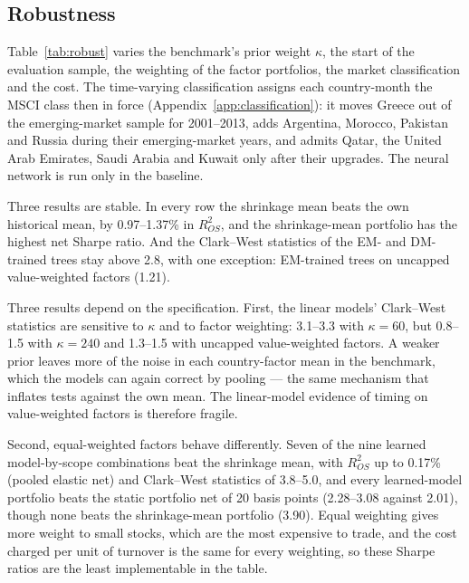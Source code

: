 \documentclass[11pt]{article}
\begin{document}
\subsection{Robustness}
Table~\ref{tab:robust} varies the benchmark's prior weight $\kappa$, the start of the evaluation sample, the weighting of the factor portfolios, the market classification and the cost. The time-varying classification assigns each country-month the MSCI class then in force (Appendix~\ref{app:classification}): it moves Greece out of the emerging-market sample for 2001--2013, adds Argentina, Morocco, Pakistan and Russia during their emerging-market years, and admits Qatar, the United Arab Emirates, Saudi Arabia and Kuwait only after their upgrades. The neural network is run only in the baseline.

Three results are stable. In every row the shrinkage mean beats the own historical mean, by 0.97--1.37\% in $R^2_{OS}$, and the shrinkage-mean portfolio has the highest net Sharpe ratio. And the Clark--West statistics of the EM- and DM-trained trees stay above 2.8, with one exception: EM-trained trees on uncapped value-weighted factors (1.21).

Three results depend on the specification. First, the linear models' Clark--West statistics are sensitive to $\kappa$ and to factor weighting: 3.1--3.3 with $\kappa = 60$, but 0.8--1.5 with $\kappa = 240$ and 1.3--1.5 with uncapped value-weighted factors. A weaker prior leaves more of the noise in each country-factor mean in the benchmark, which the models can again correct by pooling --- the same mechanism that inflates tests against the own mean. The linear-model evidence of timing on value-weighted factors is therefore fragile.

Second, equal-weighted factors behave differently. Seven of the nine learned model-by-scope combinations beat the shrinkage mean, with $R^2_{OS}$ up to 0.17\% (pooled elastic net) and Clark--West statistics of 3.8--5.0, and every learned-model portfolio beats the static portfolio net of 20 basis points (2.28--3.08 against 2.01), though none beats the shrinkage-mean portfolio (3.90). Equal weighting gives more weight to small stocks, which are the most expensive to trade, and the cost charged per unit of turnover is the same for every weighting, so these Sharpe ratios are the least implementable in the table.
\end{document}
